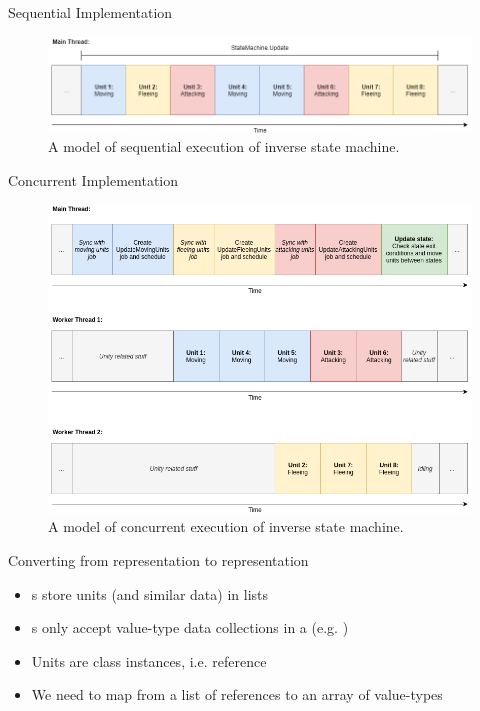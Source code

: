 \begin{frame}{\secname}{\subsecname}
	Sequential Implementation
	\begin{figure}[h!]
        \centering
        \includegraphics[width=\textwidth]{pictures/sequential.png}
        \caption{A model of sequential execution of inverse state machine.}
    \end{figure}
\end{frame}

\begin{frame}{\secname}{\subsecname}
	Concurrent Implementation
	\begin{figure}[h!]
        \centering
        \includegraphics[width=.7\textwidth]{pictures/concurrent.png}
        \caption{A model of concurrent execution of inverse state machine.}
    \end{figure}
\end{frame}

\begin{frame}[fragile]{\secname}{\subsecname}
	Converting from  representation to  representation
	\begin{itemize}
		\item<2-> s store units (and similar data) in lists
		\item<3-> s only accept value-type data collections in a  (e.g. )
		\item<4-> Units are class instances, i.e. reference
		\item<5-> We need to map from a list of references to an array of value-types
	\end{itemize}
\end{frame}

